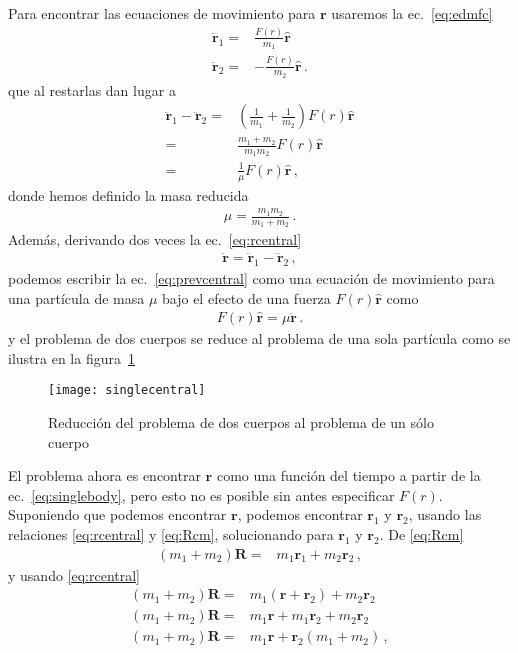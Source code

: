 Para encontrar las ecuaciones de movimiento para $\mathbf{r}$ usaremos la ec.~\eqref{eq:edmfc}
\begin{align}
  \ddot{\mathbf{r}}_1=&\frac{F(r)}{m_1}\hat{\mathbf{r}}\nonumber\\
  \ddot{\mathbf{r}}_2=&-\frac{F(r)}{m_2}\hat{\mathbf{r}}\,.
\end{align}
que al restarlas dan lugar a
\begin{align}
  \label{eq:prevcentral}
  \ddot{\mathbf{r}}_1-\ddot{\mathbf{r}}_2=&\left(\frac{1}{m_1}+\frac{1}{m_2}\right)F(r)\hat{\mathbf{r}}\nonumber\\
  =&\frac{m_1+m_2}{m_1 m_2}F(r)\hat{\mathbf{r}}\nonumber\\
  =&\frac{1}{\mu} F(r)\hat{\mathbf{r}}\,,
\end{align}
donde hemos definido la masa reducida
\begin{align}
  \mu=  \frac{m_1 m_2}{m_1+m_2}\,.
\end{align}
Además, derivando dos veces la ec.~\eqref{eq:rcentral}
\begin{align}
   \ddot{\mathbf{r}}=\ddot{\mathbf{r}}_1-\ddot{\mathbf{r}}_2\,,
\end{align}
podemos escribir la ec.~\eqref{eq:prevcentral} como una ecuación de movimiento para una partícula de masa $\mu$ bajo el efecto de una fuerza $F(r)\hat{\mathbf{r}}$ como
\begin{align}
  \label{eq:singlebody}
  F(r)\hat{\mathbf{r}}= \mu\ddot{\mathbf{r}}\,.
\end{align}
y el problema de dos cuerpos se reduce al problema de una sola partícula como se ilustra en la figura~\ref{fig:singlecentral}
\begin{figure}
  \centering
  \texttt{[image: singlecentral]}
  \caption{Reducción del problema de dos cuerpos al problema de un sólo cuerpo}
  \label{fig:singlecentral}
\end{figure}
El problema ahora es encontrar $\mathbf{r}$ como una función del tiempo a partir de la ec.~\eqref{eq:singlebody}, pero esto no es posible sin antes especificar $F(r)$. Suponiendo que podemos encontrar $\mathbf{r}$, podemos encontrar $\mathbf{r}_1$ y $\mathbf{r}_2$, usando las relaciones \eqref{eq:rcentral} y \eqref{eq:Rcm}, solucionando para $\mathbf{r}_1$ y $\mathbf{r}_2$. De \eqref{eq:Rcm}
\begin{align}
  (m_1+m_2)\mathbf{R}=&m_1\mathbf{r}_1+m_2\mathbf{r}_2\,,
\end{align}
y usando \eqref{eq:rcentral}
\begin{align}
   (m_1+m_2)\mathbf{R}=&m_1(\mathbf{r}+\mathbf{r}_2)+m_2\mathbf{r}_2\nonumber\\
     (m_1+m_2)\mathbf{R}=&m_1\mathbf{r}+m_1\mathbf{r}_2+m_2\mathbf{r}_2\nonumber\\
     (m_1+m_2)\mathbf{R}=&m_1\mathbf{r}+\mathbf{r}_2(m_1+m_2)\,,
\end{align}
